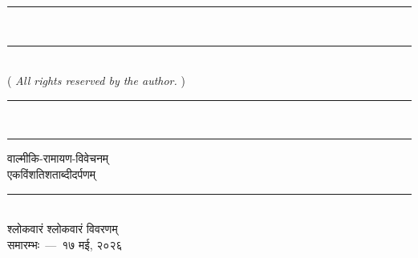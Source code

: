 
\vspace*{\fill}
\begin{center}
\en
\rule{\linewidth}{3pt}\\
\vspace{-5mm}
\rule{\linewidth}{.5pt}\\
( {\en \textit{All rights reserved by the author.}} )\\
\rule{\linewidth}{.5pt}\\
\vspace{-4mm}
\rule{\linewidth}{3pt}
\end{center}
\vspace*{\fill}
\newpage

\begin{center}
{\la\Large वाल्मीकि-रामायण-विवेचनम्}\\     %
\vspace{3mm}
{\la\Huge एकविंशतिशताब्दीदर्पणम्}\\        %
\vspace{3mm}
\rule{.15\linewidth}{.5pt}\\
\vspace{5mm}
{\la श्लोकवारं श्लोकवारं विवरणम्}\\        %
\vspace{3mm}
{\la\large समारम्भः~—~१७ मई, २०२६}        %
\end{center}
\newpage
